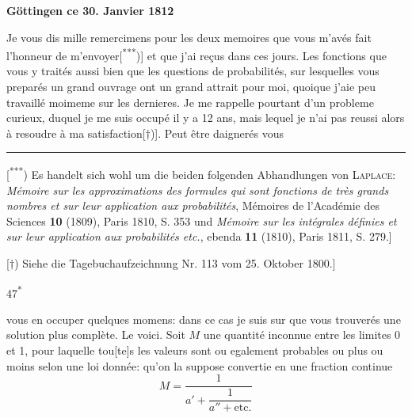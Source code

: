 \begin{flushright}\bfseries Göttingen ce 30. Janvier 1812\end{flushright}
\noindent\hspace*{.22\linewidth}{\bfseries Monsieur}\par\smallskip
\noindent\hspace*{\parindent}Je vous dis mille remercimens pour les deux memoires que vous m’avés fait l’honneur de m’envoyer[\textsuperscript{***})] et que j’ai reçus dans ces jours. Les fonctions que vous y traités aussi bien que les questions de probabilités, sur lesquelles vous preparés un grand ouvrage ont un grand attrait pour moi, quoique j’aie peu travaillé moimeme sur les dernieres. Je me rappelle pourtant d’un probleme curieux, duquel je me suis occupé il y a 12 ans, mais lequel je n’ai pas reussi alors à resoudre à ma satisfaction[$\dagger$)]. Peut être daignerés vous
\par\medskip\noindent\rule{.24\linewidth}{.4pt}\par\smallskip
{\small
\noindent\hspace*{\parindent}[\textsuperscript{***}) Es handelt sich wohl um die beiden folgenden Abhandlungen von \textsc{Laplace}: \textit{Mémoire sur les approximations des formules qui sont fonctions de très grands nombres et sur leur application aux probabilités}, Mémoires de l’Académie des Sciences \textbf{10} (1809), Paris 1810, S. 353 und \textit{Mémoire sur les intégrales définies et sur leur application aux probabilités etc.}, ebenda \textbf{11} (1810), Paris 1811, S. 279.]
\par\noindent\hspace*{\parindent}[$\dagger$) Siehe die Tagebuchaufzeichnung Nr. 113 vom 25. Oktober 1800.]
\par}
\par\noindent\hfill 47\textsuperscript{*}\par
\clearpage{}
\noindent vous en occuper quelques momens: dans ce cas je suis sur que vous trouverés une solution plus complète. Le voici. Soit $M$ une quantité inconnue entre les limites 0 et 1, pour laquelle tou[te]s les valeurs sont ou egalement probables ou plus ou moins selon une loi donnée: qu’on la suppose convertie en une fraction continue
\[
M=\frac{1}{a'+\dfrac{1}{a''+\text{etc.}}}
\]

